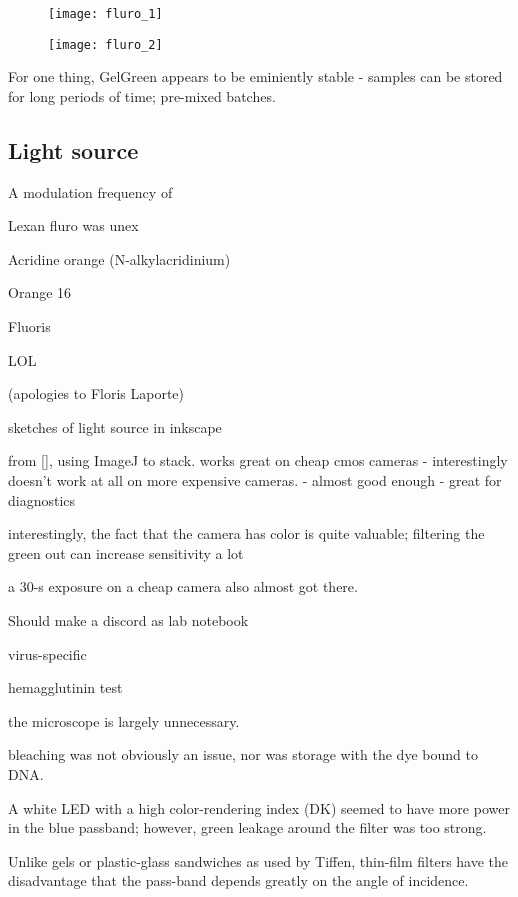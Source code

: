 \documentclass[paper.tex]{subfiles}
\begin{document}
\begin{figure}[H]
	\captionsetup{singlelinecheck = false, justification=justified}
	\centering
	\texttt{[image: fluro\_1]}
	\caption{}
\end{figure}

\begin{figure}[H]
	\captionsetup{singlelinecheck = false, justification=justified}
	\centering
	\texttt{[image: fluro\_2]}
	\caption{}
\end{figure}


For one thing, GelGreen appears to be eminiently stable - samples can be stored for long periods of time; pre-mixed batches.

\subsection{Light source}

A modulation frequency of 

Lexan fluro was unex

Acridine orange (N-alkylacridinium)

Orange 16 

Fluoris
 
 LOL
 
(apologies to Floris Laporte)

sketches of light source in inkscape

from [], using ImageJ to stack. works great on cheap cmos cameras - interestingly doesn't work at all on more expensive cameras. - 
almost good enough - great for diagnostics

interestingly, the fact that the camera has color is quite valuable; filtering the green out can increase sensitivity a lot

a 30-s exposure on a cheap camera also almost got there.

Should make a discord as lab notebook


virus-specific

hemagglutinin test

the microscope is largely unnecessary. 


bleaching was not obviously an issue, nor was storage with the dye bound to DNA.


A white LED with a high color-rendering index (DK) seemed to have more power in the blue passband; however, green leakage around the filter was too strong. 

Unlike gels or plastic-glass sandwiches as used by Tiffen, thin-film filters have the disadvantage that the pass-band depends greatly on the angle of incidence.  
\end{document}
